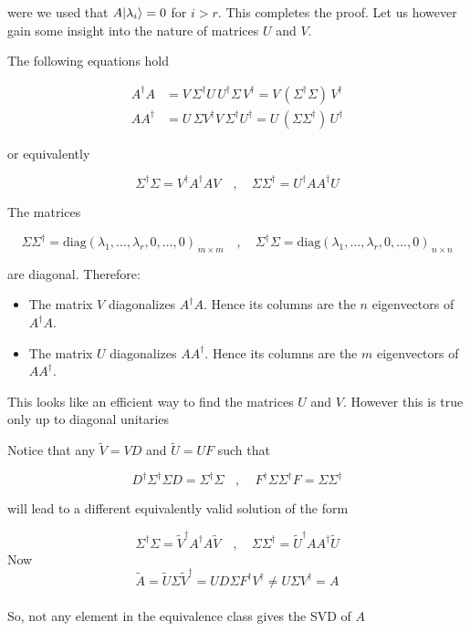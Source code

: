 \documentclass[11pt]{article}
\providecommand{\tightlist}{%
      \setlength{\itemsep}{0pt}\setlength{\parskip}{0pt}}
\begin{document}
were we used that \(A|\lambda_i\rangle=0\) for \(i>r\). This completes the
proof. Let us however gain some insight into the nature of matrices
\(U\) and \(V\).

    The following equations hold

\begin{align}
A^\dagger\! A &= V\,\Sigma^\dagger U\,U^\dagger \Sigma\,V^\dagger = V\,(\Sigma^\dagger \Sigma)\,V^\dagger \\[6pt]
A A^\dagger &= U\,\Sigma V^\dagger V\,\Sigma^\dagger U^\dagger = U\,(\Sigma \Sigma^\dagger)\,U^\dagger
\end{align}

or equivalently

\[
\Sigma^\dagger \Sigma  = V^\dagger A^\dagger A V
\quad,\quad
\Sigma \Sigma^\dagger = U^\dagger A A^\dagger U
\]

The matrices

\[
\Sigma \Sigma^\dagger = \mathrm{diag}(\lambda_1,\dots,\lambda_r,0,\dots,0)_{\,m\times m}
\quad,\quad
\Sigma^\dagger \Sigma = \mathrm{diag}(\lambda_1,\dots,\lambda_r,0,\dots,0)_{\,n\times n}
\]

are diagonal. Therefore:

\begin{itemize}
\tightlist
\item
  The matrix \(V\) diagonalizes \(A^\dagger A\). Hence its columns are
  the \(n\) eigenvectors of \(A^\dagger A\).
\item
  The matrix \(U\) diagonalizes \(A A^\dagger\). Hence its columns are
  the \(m\) eigenvectors of \(A A^\dagger\).
\end{itemize}

    This looks like an efficient way to find the matrices \(U\) and \(V\).
However this is true only up to diagonal unitaries

Notice that any \(\tilde V = VD\) and \(\tilde U = UF\) such that

\[
D^\dagger \Sigma^\dagger \Sigma D = \Sigma^\dagger \Sigma~~~~,~~~~~
F^\dagger \Sigma \Sigma^\dagger  F = \Sigma \Sigma^\dagger 
\]

will lead to a different equivalently valid solution of the form

\[
\Sigma^\dagger \Sigma  = \tilde V^\dagger A^\dagger A \tilde V
\quad,\quad
\Sigma \Sigma^\dagger = \tilde U^\dagger A A^\dagger \tilde U
\] Now\\
\[
\tilde A = \tilde U \Sigma \tilde V^\dagger = UD\Sigma F^\dagger V^\dagger \neq U\Sigma   V^\dagger = A
\]\\
So, not any element in the equivalence class gives the SVD of \(A\)
\end{document}
